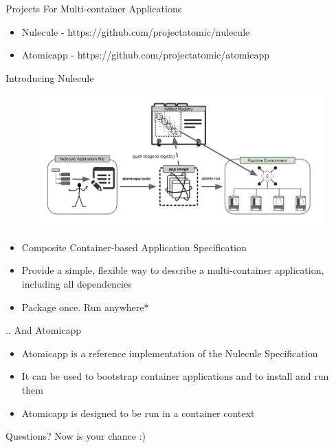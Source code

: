 \documentclass{beamer}
\begin{document}
\begin{frame}{Projects For Multi-container Applications}
\begin{itemize}
  \item Nulecule  - https://github.com/projectatomic/nulecule
  \item Atomicapp - https://github.com/projectatomic/atomicapp
\end{itemize}
\end{frame}

\begin{frame}{Introducing Nulecule}
\begin{figure}[htp]
\centering
\includegraphics[scale=0.25]{nulecule.png}
\label{}
\end{figure}
\begin{itemize}
  \item Composite Container-based Application Specification
  \item Provide a simple, flexible way to describe a multi-container application, including all dependencies
  \item Package once. Run anywhere*
\end{itemize}
\end{frame}

\begin{frame}{.. And Atomicapp}
\begin{itemize}
  \item Atomicapp is a reference implementation of the Nulecule Specification
  \item It can be used to bootstrap container applications and to install and run them
  \item Atomicapp is designed to be run in a container context
\end{itemize}
\end{frame}

\begin{frame}{Questions?}
Now is your chance :)
\end{frame}
\end{document}
